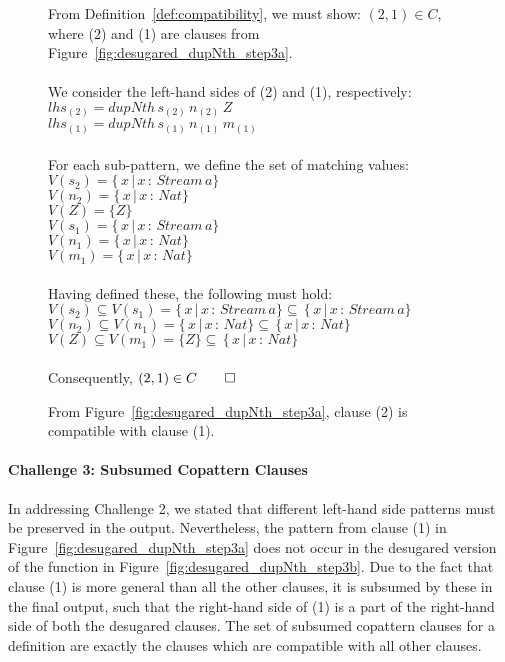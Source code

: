\begin{figure}
From
Definition~\ref{def:compatibility}, we must show: $(2,1)\in C$, where (2) and (1) are clauses from
Figure~\ref{fig:desugared_dupNth_step3a}.
\\\\
We consider the left-hand sides of (2) and (1), respectively:\\
$lhs_{(2)} = dupNth\,s_{(2)}\,n_{(2)}\,Z$\\
$lhs_{(1)} = dupNth\,s_{(1)}\,n_{(1)}\,m_{(1)}$\\
\\
For each sub-pattern, we define the set of matching values:\\
$V(s_{2}) = \{\,x\,|\,x\,:\,Stream\,a\}$\\
$V(n_{2}) = \{\,x\,|\,x\,:\,Nat\}$\\
$V(Z) = \{Z\}$\\
$V(s_{1}) = \{\,x\,|\,x\,:\,Stream\,a\}$\\
$V(n_{1}) = \{\,x\,|\,x\,:\,Nat\}$\\
$V(m_{1}) = \{\,x\,|\,x\,:\,Nat\}$\\
\\
Having defined these, the following must hold:
\\
$V(s_{2})\subseteq V(s_{1}) = \{\,x\,|\,x\,:\,Stream\,a\}\subseteq\,\{\,x\,|\,x\,:\,Stream\,a\}$\\
$V(n_{2})\subseteq V(n_{1}) =
\{\,x\,|\,x\,:\,Nat\}\subseteq\,\{\,x\,|\,x\,:\,Nat\}$\\
$V(Z)\subseteq V(m_{1}) = \{Z\}\subseteq\,\{\,x\,|\,x\,:\,Nat\}$\\\\
Consequently, $(2,1)\in C \qed$ 
  \caption{From Figure~\ref{fig:desugared_dupNth_step3a}, clause (2) is
    compatible with clause (1).}
  \label{fig:compatibility_proof}
\end{figure}


\paragraph{Challenge 3: Subsumed Copattern Clauses}
In addressing Challenge 2, we stated that different left-hand side patterns must
be preserved in the output. Nevertheless, the pattern from clause (1) in
Figure~\ref{fig:desugared_dupNth_step3a} does not occur in the
desugared version of the function in
Figure~\ref{fig:desugared_dupNth_step3b}. Due to the fact that clause (1) is
more general than all the other clauses, it is subsumed by these in the final
output, such that the right-hand side of (1) is a part of the right-hand side of
both the desugared clauses. The set of subsumed copattern clauses for a
definition are exactly the clauses which are compatible with all other clauses.  


